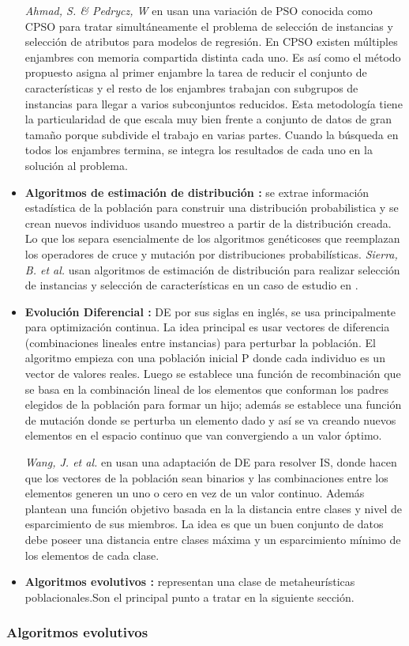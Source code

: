 \begin{itemize}
\emph{Ahmad, S. \& Pedrycz, W} en \cite{ahmad2011feature} usan una variación de PSO conocida como CPSO para tratar simultáneamente el problema de selección de instancias y selección de atributos para modelos de regresión. En CPSO existen múltiples enjambres con memoria compartida distinta cada uno. Es así como el método propuesto asigna al primer enjambre la tarea de reducir el conjunto de características y el resto de los enjambres trabajan con subgrupos de instancias para llegar a varios subconjuntos reducidos. Esta metodología tiene la particularidad de que escala muy bien frente a conjunto de datos de gran tamaño porque subdivide el trabajo en varias partes. Cuando la búsqueda en todos los enjambres termina, se integra los resultados de cada uno en la solución al problema.

\item \textbf{Algoritmos de estimación de distribución \cite{talbi2009metaheuristics,lozano2006towards}:}
se extrae información estadística de la población para construir una distribución probabilistica y se crean nuevos individuos usando muestreo a partir de la distribución creada. Lo que los separa esencialmente de los algoritmos genéticoses que reemplazan los operadores de cruce y mutación por distribuciones probabilísticas. \emph{Sierra, B. et al.} usan algoritmos de estimación de distribución para realizar selección de instancias y selección de características en un caso de estudio en \cite{sierra2001prototype}.

\item \textbf{Evolución Diferencial \cite{talbi2009metaheuristics,price2006differential}:}
DE por sus siglas en inglés, se usa principalmente para optimización continua. La idea principal es usar vectores de diferencia (combinaciones lineales entre instancias) para perturbar la población. El algoritmo empieza con una población inicial P donde cada individuo es un vector de valores reales. Luego se establece una función de recombinación que se basa en la combinación lineal de los elementos que conforman los padres elegidos de la población para formar un hijo; además se establece una función de mutación donde se perturba un elemento dado y así se va creando nuevos elementos en el espacio continuo que van convergiendo a un valor óptimo.

\emph{Wang, J. et al.} en \cite{wang2016differential} usan una adaptación de DE para resolver IS, donde hacen que los vectores de la población sean binarios y las combinaciones entre los elementos generen un uno o cero en vez de un valor continuo. Además plantean una función objetivo basada en la la distancia entre clases y nivel de esparcimiento de sus miembros. La idea es que un buen conjunto de datos debe poseer una distancia entre clases máxima y un esparcimiento mínimo de los elementos de cada clase.

\item \textbf{Algoritmos evolutivos \cite{talbi2009metaheuristics}:}
representan una clase de metaheurísticas poblacionales.Son el principal punto a tratar en la siguiente sección.
\end{itemize} 

\subsubsection{Algoritmos evolutivos}